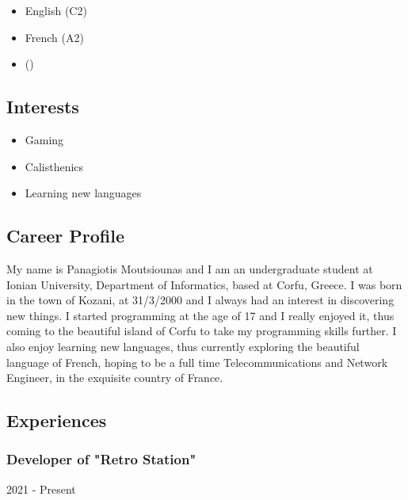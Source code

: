 \documentclass[english,]{article}
\providecommand{\tightlist}{%
  \setlength{\itemsep}{0pt}\setlength{\parskip}{0pt}}
\begin{document}
\begin{itemize}
\tightlist
\item
  English {(C2)}
\item
  French {(A2)}
\item
  {()}
\end{itemize}

\hypertarget{interests}{%
\subsection{Interests}\label{interests}}

\begin{itemize}
\tightlist
\item
  Gaming
\item
  Calisthenics
\item
  Learning new languages
\end{itemize}

\hypertarget{career-profile}{%
\subsection{\texorpdfstring{{ \emph{} \emph{} } Career
Profile}{    Career Profile}}\label{career-profile}}

My name is Panagiotis Moutsiounas and I am an undergraduate student at
Ionian University, Department of Informatics, based at Corfu, Greece. I
was born in the town of Kozani, at 31/3/2000 and I always had an
interest in discovering new things. I started programming at the age of
17 and I really enjoyed it, thus coming to the beautiful island of Corfu
to take my programming skills further. I also enjoy learning new
languages, thus currently exploring the beautiful language of French,
hoping to be a full time Telecommunications and Network Engineer, in the
exquisite country of France.

\hypertarget{experiences}{%
\subsection{\texorpdfstring{{ \emph{} \emph{} }
Experiences}{    Experiences}}\label{experiences}}

\hypertarget{developer-of-retro-station}{%
\subsubsection{Developer of "Retro
Station"}\label{developer-of-retro-station}}

2021 - Present
\end{document}
